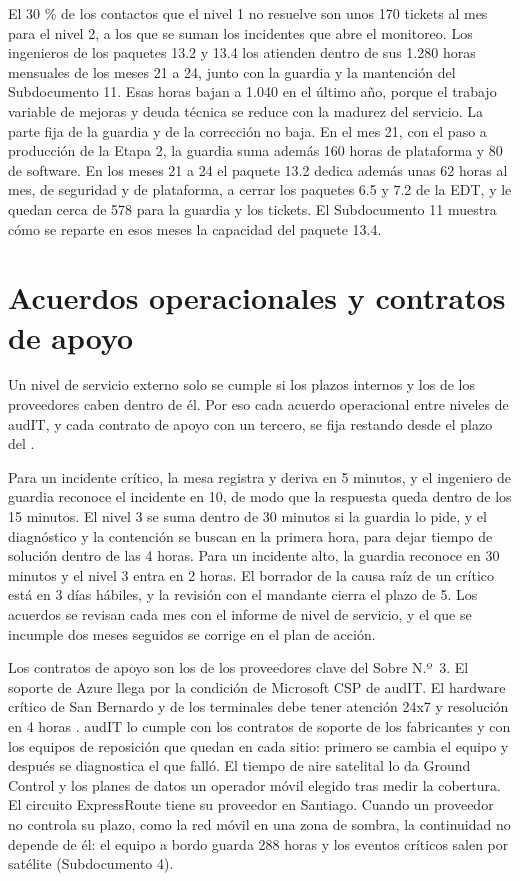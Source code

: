 El 30 \% de los contactos que el nivel 1 no resuelve son unos 170 tickets al mes para el nivel 2, a los
que se suman los incidentes que abre el monitoreo. Los ingenieros de los paquetes 13.2 y 13.4 los
atienden dentro de sus 1.280 horas mensuales de los meses 21 a 24, junto con la guardia y la mantención
del Subdocumento 11. Esas horas bajan a 1.040 en el último año, porque el trabajo variable de mejoras
y deuda técnica se reduce con la madurez del servicio. La parte fija de la guardia y de la corrección no
baja. En el mes 21, con el paso a producción de la Etapa 2, la guardia suma además 160 horas de
plataforma y 80 de software.
En los meses 21 a 24 el paquete 13.2 dedica además unas 62 horas al mes, de seguridad y de plataforma,
a cerrar los paquetes 6.5 y 7.2 de la EDT, y le quedan cerca de 578 para la guardia y los tickets. El
Subdocumento 11 muestra cómo se reparte en esos meses la capacidad del paquete 13.4.

\section{Acuerdos operacionales y contratos de apoyo}\label{sec:10-acuerdos-operacionales-y-contrat}

Un nivel de servicio externo solo se cumple si los plazos internos y los de los proveedores caben dentro
de él. Por eso cada acuerdo operacional entre niveles de audIT, y cada contrato de apoyo con un tercero,
se fija restando desde el plazo del .

Para un incidente crítico, la mesa registra y deriva en 5 minutos, y el ingeniero de guardia reconoce el
incidente en 10, de modo que la respuesta queda dentro de los 15 minutos. El nivel 3 se suma dentro de
30 minutos si la guardia lo pide, y el diagnóstico y la contención se buscan en la primera hora, para
dejar tiempo de solución dentro de las 4 horas. Para un incidente alto, la guardia reconoce en 30
minutos y el nivel 3 entra en 2 horas. El borrador de la causa raíz de un crítico está en 3 días hábiles,
y la revisión con el mandante cierra el plazo de 5. Los acuerdos se revisan cada mes con el informe de
nivel de servicio, y el que se incumple dos meses seguidos se corrige en el plan de acción.

Los contratos de apoyo son los de los proveedores clave del Sobre N.º~3. El soporte de Azure llega por la
condición de Microsoft CSP de audIT. El hardware crítico de San Bernardo y de los terminales debe tener
atención 24x7 y resolución en 4 horas . audIT lo cumple con los contratos de
soporte de los fabricantes y con los equipos de reposición que quedan en cada sitio: primero se cambia
el equipo y después se diagnostica el que falló. El tiempo de aire satelital lo da Ground Control y los planes de datos un operador móvil
elegido tras medir la cobertura. El circuito ExpressRoute tiene su proveedor en Santiago. Cuando un
proveedor no controla su plazo, como la red móvil en una zona de sombra, la continuidad no depende de
él: el equipo a bordo guarda 288 horas y los eventos críticos salen por satélite (Subdocumento 4).

